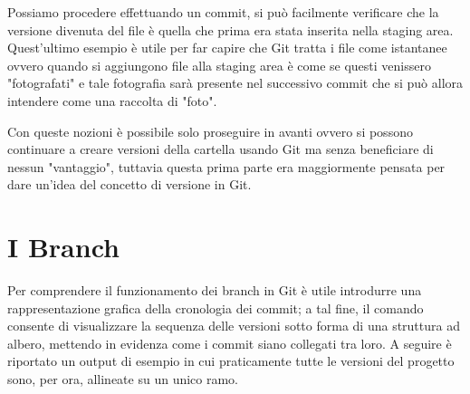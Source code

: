 Possiamo procedere effettuando un commit, si può facilmente verificare che la versione divenuta  del file  è quella che prima era stata inserita nella staging area. Quest'ultimo esempio è utile per far capire che Git tratta i file come istantanee ovvero quando si aggiungono file alla staging area è come se questi venissero "fotografati" e tale fotografia sarà presente nel successivo commit che si può allora intendere come una raccolta di "foto". 

Con queste nozioni è possibile solo proseguire in avanti ovvero si possono continuare a creare versioni della cartella usando Git ma senza beneficiare di nessun "vantaggio", tuttavia questa prima parte era maggiormente pensata per dare un'idea del concetto di versione in Git.


\section{I Branch}
\label{sec:branch}
Per comprendere il funzionamento dei branch in Git è utile introdurre una rappresentazione grafica della cronologia dei commit; a tal fine, il comando  consente di visualizzare la sequenza delle versioni sotto forma di una struttura ad albero, mettendo in evidenza come i commit siano collegati tra loro. 
A seguire è riportato un output di esempio in cui praticamente tutte le versioni del progetto sono, per ora, allineate su un unico ramo.


